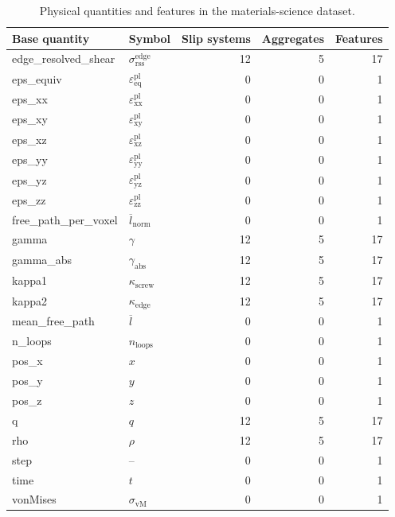 \begin{table}[t]
	\centering
	\caption{
		Physical quantities and features in the materials-science dataset.
	}
	\begin{tabular}{llrrr}
		\toprule
		Base quantity & Symbol & Slip systems & Aggregates & Features \\
		\midrule
		edge\_resolved\_shear & $\sigma_\text{rss}^\text{edge}$ &            12 &           5 &        17 \\
		eps\_equiv & $\varepsilon_\text{eq}^\text{pl}$ &              0 &           0 &         1 \\
		eps\_xx & $\varepsilon_\text{xx}^\text{pl}$ &              0 &           0 &         1 \\
		eps\_xy & $\varepsilon_\text{xy}^\text{pl}$ &              0 &           0 &         1 \\
		eps\_xz & $\varepsilon_\text{xz}^\text{pl}$ &              0 &           0 &         1 \\
		eps\_yy & $\varepsilon_\text{yy}^\text{pl}$ &              0 &           0 &         1 \\
		eps\_yz & $\varepsilon_\text{yz}^\text{pl}$ &              0 &           0 &         1 \\
		eps\_zz & $\varepsilon_\text{zz}^\text{pl}$ &              0 &           0 &         1 \\
		free\_path\_per\_voxel & $\overline{l}_\text{norm}$ &              0 &           0 &         1 \\
		gamma & $\gamma$ &             12 &           5 &        17 \\
		gamma\_abs & $\gamma_\text{abs}$ &             12 &           5 &        17 \\
		kappa1 & $\kappa_\text{screw}$ &             12 &           5 &        17 \\
		kappa2 & $\kappa_\text{edge}$ &             12 &           5 &        17 \\
		mean\_free\_path & $\overline{l}$ &              0 &           0 &         1 \\
		n\_loops & $n_\text{loops}$ &              0 &           0 &         1 \\
		pos\_x & $x$ &              0 &           0 &         1 \\
		pos\_y & $y$ &              0 &           0 &         1 \\
		pos\_z & $z$ &              0 &           0 &         1 \\
		q & $q$ &             12 &           5 &        17 \\
		rho & $\rho$ &             12 &           5 &        17 \\
		step & -- &              0 &           0 &         1 \\
		time & $t$ &              0 &           0 &         1 \\
		vonMises & $\sigma_\text{vM}$ &              0 &           0 &         1 \\
		\bottomrule
	\end{tabular}
	\label{tab:ms:features}
\end{table}

